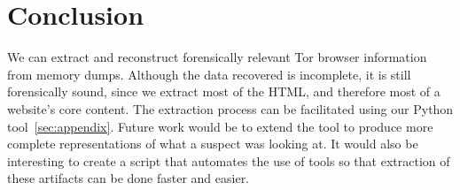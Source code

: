 \section{Conclusion}
\label{sec:conclusion}

We can extract and reconstruct forensically relevant Tor browser
information from memory dumps. Although the data recovered is
incomplete, it is still forensically sound, since we extract most of
the HTML, and therefore most of a website's core content. The
extraction process can be facilitated using our Python
tool~\ref{sec:appendix}. Future work would be to extend the tool to
produce more complete representations of what a suspect was looking
at. It would also be interesting to create a script that automates the
use of tools so that extraction of these artifacts can be done faster
and easier.
